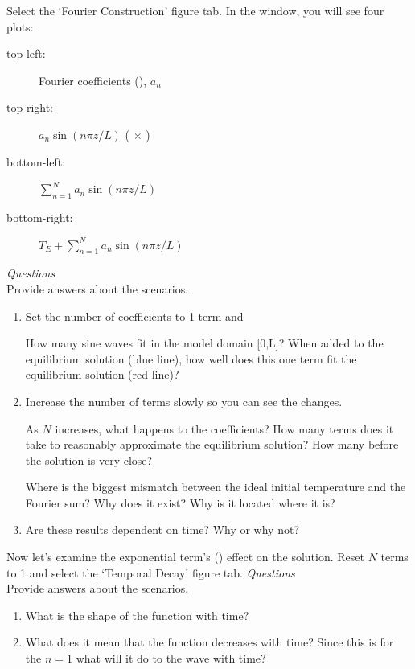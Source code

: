 \documentclass[11pt,a4paper,final]{article}
\begin{document}
\begin{enumerate}
    Select the `Fourier Construction' figure tab. In the window, you will see four plots:
    \begin{description}
        \item[top-left:] Fourier coefficients (), $a_n$
        \item[top-right:] $a_n \sin (n \pi z / L)$ ( $\times$ )
        \item[bottom-left:] $\sum_{n=1}^N a_n \sin(n \pi z / L)$
        \item[bottom-right:] $T_{E} + \sum_{n=1}^N a_n \sin (n \pi z / L)$
    \end{description}

    \noindent \emph{Questions} \\
    Provide answers about the scenarios.
    \begin{enumerate}
        \item Set the number of coefficients to 1 term and 

        How many sine waves fit in the model domain [0,L]?  When added to the equilibrium solution (blue line), how well does this one term fit the equilibrium solution (red line)?

        \item Increase the number of terms slowly so you can see the changes.

        As $N$ increases, what happens to the coefficients?  How many terms does it take to reasonably approximate the equilibrium solution?  How many before the solution is very close?
        
        Where is the biggest mismatch between the ideal initial temperature and the Fourier sum?  Why does it exist?  Why is it located where it is?

        \item Are these results dependent on time?  Why or why not?
    \end{enumerate}

    Now let's examine the exponential term's () effect on the solution.  Reset $N$ terms to 1 and select the `Temporal Decay' figure tab.
    \noindent \emph{Questions} \\
    Provide answers about the scenarios.
    \begin{enumerate}
        \item What is the shape of the function with time?

        \item What does it mean that the function decreases with time?  Since this is for the $n=1$ what will it do to the wave with time?


\end{enumerate}
\end{enumerate}
\end{document}
